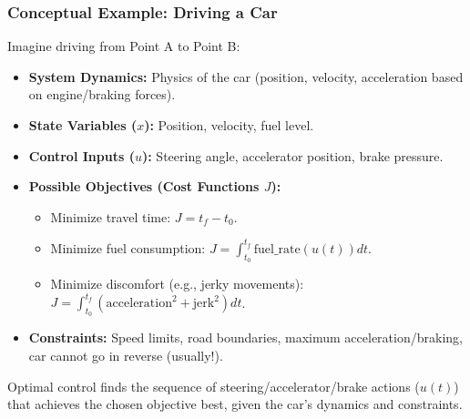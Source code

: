 \documentclass{beamer}
\begin{document}
\begin{frame}
\frametitle{Conceptual Example: Driving a Car}
    Imagine driving from Point A to Point B:
    \begin{itemize}
        \item \textbf{System Dynamics:} Physics of the car (position, velocity, acceleration based on engine/braking forces).
        \item \textbf{State Variables ($x$):} Position, velocity, fuel level.
        \item \textbf{Control Inputs ($u$):} Steering angle, accelerator position, brake pressure.
        \item \textbf{Possible Objectives (Cost Functions $J$):}
        \begin{itemize}
            \item Minimize travel time: $J = t_f - t_0$.
            \item Minimize fuel consumption: $J = \int_{t_0}^{t_f} \text{fuel\_rate}(u(t)) dt$.
            \item Minimize discomfort (e.g., jerky movements): $J = \int_{t_0}^{t_f} (\text{acceleration}^2 + \text{jerk}^2) dt$.
        \end{itemize}
        \item \textbf{Constraints:} Speed limits, road boundaries, maximum acceleration/braking, car cannot go in reverse (usually!).
    \end{itemize}
    Optimal control finds the sequence of steering/accelerator/brake actions ($u(t)$) that achieves the chosen objective best, given the car's dynamics and constraints.
\end{frame}
\end{document}
